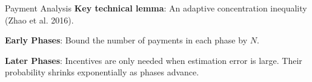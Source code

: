 \documentclass[serif]{beamer}
\begin{document}





\begin{frame}{Payment Analysis}
\textbf{Key technical lemma}: An adaptive concentration inequality (Zhao et al. 2016).
\vspace{1cm}

\textbf{Early Phases}: Bound the number of payments in each phase by $N$.
\vspace{1cm}

\textbf{Later Phases}: Incentives are only needed when estimation error is large.  Their probability shrinks exponentially as phases advance.
\end{frame}
\end{document}
